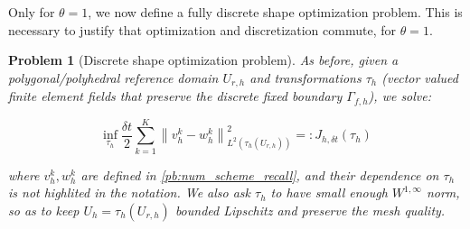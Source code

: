 \documentclass[english,a4paper,9pt,oneside]{scrbook}	%
\theoremstyle{break}
\newtheorem{pb}[equation]{Problem}
\theoremstyle{remark}
\newcommand{\norm}[1]{\left\lVert#1\right\rVert}
\newcommand{\te}{\theta}
\begin{document}
%


Only for $\te = 1$, we now define a fully discrete shape optimization problem. This is necessary to justify that optimization and discretization commute, for $\theta=1$.  



\begin{pb}[Discrete shape optimization problem]
\label{pb:discr_shopt}
As before, given a polygonal/polyhedral reference domain $U_{r,h}$ and transformations $\tau_h$ (vector valued finite element fields that preserve the discrete fixed boundary $\Gamma_{f,h}$), we solve:

$$\inf_{\tau_h }\frac{\delta t}{2}\sum_{k=1}^{K}\norm{v_h^k-w^k_h}_{L^2(\tau_h(U_{r,h}))}^2=:J_{h,\delta t}(\tau_h)$$


where $v_h^k, w^k_h$ are defined in \cref{pb:num_scheme_recall}, and their dependence on $\tau_h$ is not highlited in the notation. We also ask $\tau_h$ to have small enough $W^{1,\infty}$ norm, so as to keep $U_h = \tau_h(U_{r,h})$ bounded Lipschitz and preserve the mesh quality.

\end{pb}
\end{document}
